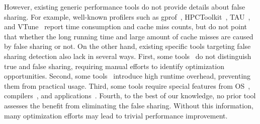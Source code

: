 However, existing generic performance tools do not provide details about false sharing. For example, well-known profilers such as gprof~\cite{gprof}, HPCToolkit~\cite{ibs-sc}, TAU~\cite{Malony-etal:2008:TAU}, and VTune~\cite{Intel:VTune} report time consumption and cache miss counts, but do not point that whether the long running time and large amount of cache misses are caused by false sharing or not. On the other hand, existing specific tools targeting false sharing detection also lack in several ways. First, some tools~\cite{falseshare:binaryinstrumentation1,detect:ptu,detect:intel,falseshare:binaryinstrumentation2,DProf, qinzhao, OSdetection, mldetect, Wicaksono11detectingfalse, openmp} do not distinguish true and false sharing, requiring manual efforts to identify optimization opportunities. Second, some tools~\cite{falseshare:binaryinstrumentation1,falseshare:binaryinstrumentation2,falseshare:simulator, Predator} introduce high runtime overhead, preventing them from practical usage. Third, some tools require special features from OS~\cite{OSdetection}, compilers~\cite{Predator}, and applications~\cite{Sheriff}. Fourth, to the best of our knowledge, no prior tool assesses the benefit from eliminating the false sharing. Without this information, many optimization efforts may lead to trivial performance improvement.

\vspace{0.2in}

